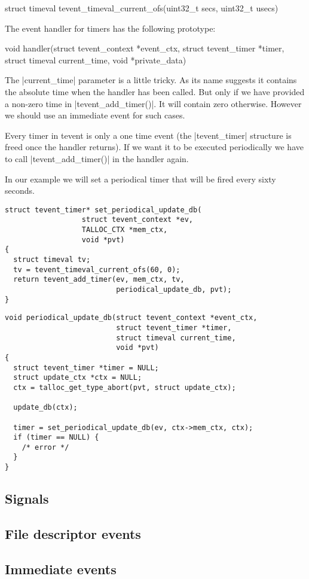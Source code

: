 \begin{funcproto}
struct timeval tevent_timeval_current_ofs(uint32_t secs,
                                          uint32_t usecs)
\end{funcproto}
\funclistend
The event handler for timers has the following prototype:

\begin{funcproto}
void handler(struct tevent_context *event_ctx,
             struct tevent_timer *timer,
             struct timeval current_time,
             void *private_data)
\end{funcproto}
\funclistend
The |current_time| parameter is a little tricky. As its name suggests it
contains the absolute time when the handler has been called. But only if we have
provided a non-zero time in |tevent_add_timer()|. It will contain zero
otherwise. However we should use an immediate event for such cases.

Every timer in tevent is only a one time event (the |tevent_timer| structure is
freed once the handler returns). If we want it to be executed periodically we
have to call |tevent_add_timer()| in the handler again.

In our example we will set a periodical timer that will be fired every sixty
seconds.

\begin{lstlisting}[morekeywords={tevent_add_timer},name=PeriodicalUpdateDB]
struct tevent_timer* set_periodical_update_db(
                  struct tevent_context *ev,
                  TALLOC_CTX *mem_ctx,
                  void *pvt)
{
  struct timeval tv;
  tv = tevent_timeval_current_ofs(60, 0);
  return tevent_add_timer(ev, mem_ctx, tv,
                          periodical_update_db, pvt);
}
\end{lstlisting}
\begin{lstlisting}[caption={Periodical update of a database},firstnumber=auto,
morekeywords={set_periodical_update_db},name=PeriodicalUpdateDB]
void periodical_update_db(struct tevent_context *event_ctx,
                          struct tevent_timer *timer,
                          struct timeval current_time,
                          void *pvt)
{
  struct tevent_timer *timer = NULL;
  struct update_ctx *ctx = NULL;
  ctx = talloc_get_type_abort(pvt, struct update_ctx);

  update_db(ctx);
  
  timer = set_periodical_update_db(ev, ctx->mem_ctx, ctx);
  if (timer == NULL) {
    /* error */
  }
}
\end{lstlisting}

\subsection{Signals}

\subsection{File descriptor events}

\subsection{Immediate events}